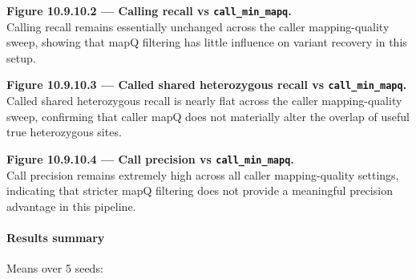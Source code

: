 \documentclass[
]{article}
\begin{document}
\textbf{Figure 10.9.10.2 --- Calling recall vs
\texttt{call\_min\_mapq}.}\\
Calling recall remains essentially unchanged across the caller
mapping-quality sweep, showing that mapQ filtering has little influence
on variant recovery in this setup.

\textbf{Figure 10.9.10.3 --- Called shared heterozygous recall vs
\texttt{call\_min\_mapq}.}\\
Called shared heterozygous recall is nearly flat across the caller
mapping-quality sweep, confirming that caller mapQ does not materially
alter the overlap of useful true heterozygous sites.

\textbf{Figure 10.9.10.4 --- Call precision vs
\texttt{call\_min\_mapq}.}\\
Call precision remains extremely high across all caller mapping-quality
settings, indicating that stricter mapQ filtering does not provide a
meaningful precision advantage in this pipeline.

\paragraph{Results summary}\label{results-summary-9}

Means over 5 seeds:
\end{document}
